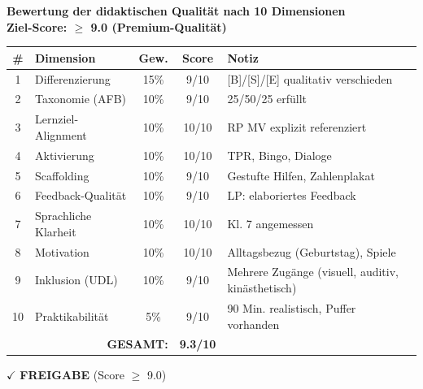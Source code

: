 \documentclass[11pt,a4paper]{article}
\begin{document}
\begin{scorebox}
\textbf{Bewertung der didaktischen Qualität nach 10 Dimensionen}\\
\textbf{Ziel-Score: $\geq$ 9.0 (Premium-Qualität)}

\vspace{1em}
\begin{tabular}{|c|l|c|c|p{4cm}|}
\hline
\textbf{\#} & \textbf{Dimension} & \textbf{Gew.} & \textbf{Score} & \textbf{Notiz} \\
\hline
1 & Differenzierung & 15\% & 9/10 & [B]/[S]/[E] qualitativ verschieden \\
\hline
2 & Taxonomie (AFB) & 10\% & 9/10 & 25/50/25 erfüllt \\
\hline
3 & Lernziel-Alignment & 10\% & 10/10 & RP MV explizit referenziert \\
\hline
4 & Aktivierung & 10\% & 10/10 & TPR, Bingo, Dialoge \\
\hline
5 & Scaffolding & 10\% & 9/10 & Gestufte Hilfen, Zahlenplakat \\
\hline
6 & Feedback-Qualität & 10\% & 9/10 & LP: elaboriertes Feedback \\
\hline
7 & Sprachliche Klarheit & 10\% & 10/10 & Kl. 7 angemessen \\
\hline
8 & Motivation & 10\% & 10/10 & Alltagsbezug (Geburtstag), Spiele \\
\hline
9 & Inklusion (UDL) & 10\% & 9/10 & Mehrere Zugänge (visuell, auditiv, kinästhetisch) \\
\hline
10 & Praktikabilität & 5\% & 9/10 & 90 Min. realistisch, Puffer vorhanden \\
\hline
\multicolumn{3}{|r|}{\textbf{GESAMT:}} & \textbf{9.3/10} & \\
\hline
\end{tabular}

\vspace{1em}
$\checkmark$ \textcolor{successgreen}{\textbf{FREIGABE} (Score $\geq$ 9.0)}
\end{scorebox}
\end{document}
